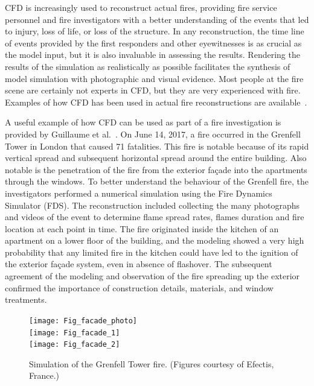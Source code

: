 \documentclass[graybox]{svmult}
\begin{document}
CFD is increasingly used to reconstruct  actual  fires,  providing  fire  service  personnel and fire investigators with a better understanding of the events that led to injury, loss of life, or loss of the structure. In any reconstruction, the time line of events provided by the first responders and other eyewitnesses is as crucial as the model input, but it is also invaluable in assessing the results. Rendering the results of the simulation as realistically as possible facilitates the synthesis of model simulation with photographic and visual evidence. Most people at the fire scene are certainly not experts in CFD, but they are very experienced with fire. Examples of how CFD has been used in actual fire reconstructions are available~\cite{Grosshandler, McGrattan:2005, Madrzykowski:2000, Madrzykowski:2004, Christensen}.

A useful example of how CFD can be used as part of a fire investigation is provided by Guillaume et al.~\cite{Guillaume:FM_Part_1,Guillaume:FM_Part_2,Guillaume:FM_Part_3,Guillaume:FM_Part_4}. On June 14, 2017, a fire occurred in the Grenfell Tower in London that caused 71 fatalities. This fire is notable because of its rapid vertical spread and subsequent horizontal spread around the entire building. Also notable is the penetration of the fire from the exterior fa\c{c}ade into the apartments through the windows. To better understand the behaviour of the Grenfell fire, the investigators performed a numerical simulation using the Fire Dynamics Simulator (FDS).  The reconstruction included collecting the many photographs and videos of the event to determine flame spread rates, flames duration and fire location at each point in time. The fire originated inside the kitchen of an apartment on a lower floor of the building, and the modeling showed a very high probability that any limited fire in the kitchen could have led to the ignition of the exterior fa\c{c}ade system, even in absence of flashover. The subsequent agreement of the modeling and observation of the fire spreading up the exterior confirmed the importance of construction details, materials, and window treatments.

\begin{figure}[ht]
\begin{center}
\texttt{[image: Fig\_facade\_photo]} \\
\texttt{[image: Fig\_facade\_1]} \\
\texttt{[image: Fig\_facade\_2]}
\end{center}
\caption{Simulation of the Grenfell Tower fire. (Figures courtesy of Efectis, France.)}
\label{Grenfell}
\end{figure}
\end{document}
